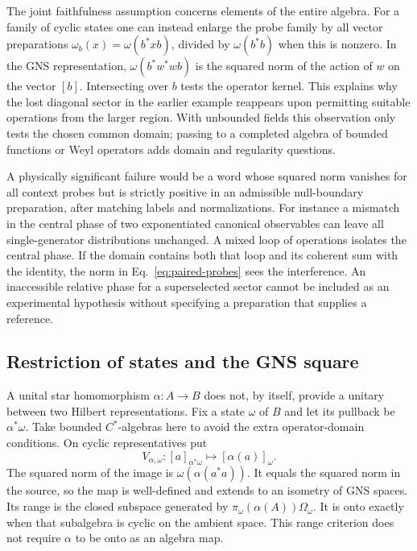 \documentclass[11pt,letterpaper]{article}
\begin{document}
The joint faithfulness assumption concerns elements of the entire algebra.
For a family of cyclic states one can instead enlarge the probe family by
all vector preparations \(\omega_b(x)=\omega(b^*xb)\), divided by
\(\omega(b^*b)\) when this is nonzero. In the GNS representation,
\(\omega(b^*w^*w b)\) is the squared norm of the action of \(w\) on the
vector \([b]\). Intersecting over \(b\) tests the operator kernel. This
explains why the lost diagonal sector in the earlier example reappears
upon permitting suitable operations from the larger region. With
unbounded fields this observation only tests the chosen common domain;
passing to a completed algebra of bounded functions or Weyl operators
adds domain and regularity questions.

A physically significant failure would be a word whose squared norm
vanishes for all context probes but is strictly positive in an admissible
null-boundary preparation, after matching labels and normalizations.
For instance a mismatch in the central phase of two exponentiated
canonical observables can leave all single-generator distributions
unchanged. A mixed loop of operations isolates the central phase. If the
domain contains both that loop and its coherent sum with the identity,
the norm in Eq.~\eqref{eq:paired-probes} sees the interference.
An inaccessible relative phase for a superselected sector cannot be
included as an experimental hypothesis without specifying a preparation
that supplies a reference.

\subsection{Restriction of states and the GNS square}
A unital star homomorphism \(\alpha:A\to B\) does not, by itself,
provide a unitary between two Hilbert representations. Fix a state
\(\omega\) of \(B\) and let its pullback be \(\alpha^*\omega\).
Take bounded \(C^*\)-algebras here to avoid the extra operator-domain
conditions. On cyclic representatives put
\[
 V_{\alpha,\omega}:[a]_{\alpha^*\omega}\longmapsto
 [\alpha(a)]_\omega .
\]
The squared norm of the image is \(\omega(\alpha(a^*a))\). It equals
the squared norm in the source, so the map is well-defined and extends
to an isometry of GNS spaces. Its range is the closed subspace generated
by \(\pi_\omega(\alpha(A))\Omega_\omega\). It is onto exactly when that
subalgebra is cyclic on the ambient space. This range criterion does
not require \(\alpha\) to be onto as an algebra map.
\end{document}
